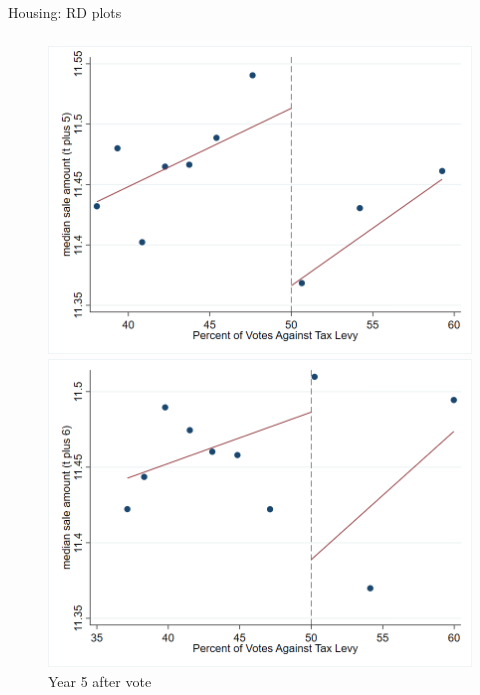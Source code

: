 \documentclass{beamer}
\begin{document}
\begin{frame}{Housing: RD plots}
    \frametitle{}
    
    \begin{figure}[htbp]
        \centering
        \begin{minipage}[b]{0.35\textwidth}
            \centering
            \includegraphics[width=\textwidth]{assets/imgs/rd_plot_median_sale_amount_t_plus_5_tri_mserd_1_2_within.png}
            \caption{Year 5 after vote}
        \end{minipage}
        \hfill
        \begin{minipage}[b]{0.35\textwidth}
            \centering
            \includegraphics[width=\textwidth]{assets/imgs/rd_plot_median_sale_amount_t_plus_6_tri_mserd_1_2_within.png}

\end{minipage}
\end{figure}
\end{frame}
\end{document}
